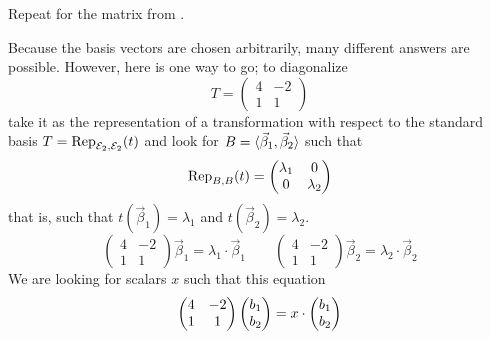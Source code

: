 \begin{exercises}
  \recommended \item 
    Repeat  for the matrix from 
    .
    \begin{answer}
      Because the basis vectors are chosen arbitrarily, many different answers
      are possible.
      However, here is one way to go;
      to diagonalize
      \begin{equation*}
         T=\begin{pmatrix}
            4  &-2  \\
            1  &1
         \end{pmatrix}
      \end{equation*}
      take it as the representation of a transformation with respect to the
      standard basis $T=\rep{t}{\stdbasis_2,\stdbasis_2}$ and look for
      \( B=\sequence{\vec{\beta}_1,\vec{\beta}_2} \) such that
      \begin{equation*}
        \rep{t}{B,B}
        =
        \begin{pmatrix}
          \lambda_1  &0          \\
          0          &\lambda_2
        \end{pmatrix}
      \end{equation*}
      that is, such that 
      $t(\vec{\beta}_1)=\lambda_1$ and $t(\vec{\beta}_2)=\lambda_2$.
      \begin{equation*}
        \begin{pmatrix}
           4  &-2  \\
           1  &1
        \end{pmatrix}
        \vec{\beta}_1=\lambda_1\cdot\vec{\beta}_1
        \qquad
        \begin{pmatrix}
           4  &-2  \\
           1  &1
        \end{pmatrix}
        \vec{\beta}_2=\lambda_2\cdot\vec{\beta}_2
      \end{equation*} 
      We are looking for scalars \( x \) such that this equation
      \begin{equation*}
       \begin{pmatrix}
          4  &-2  \\
          1  &1
       \end{pmatrix}
       \colvec{b_1 \\ b_2}=x\cdot\colvec{b_1 \\ b_2}
      \end{equation*}

\end{answer}
\end{exercises}
